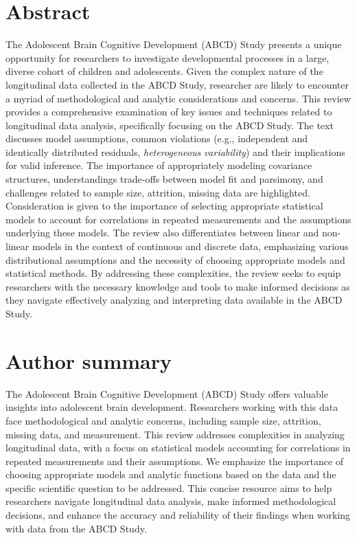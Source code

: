 \documentclass[
  10pt,
  letterpaper,
]{article}
\begin{document}
\section*{Abstract}
The Adolescent Brain Cognitive Development (ABCD) Study presents a
unique opportunity for researchers to investigate developmental
processes in a large, diverse cohort of children and adolescents. Given
the complex nature of the longitudinal data collected in the ABCD Study,
researcher are likely to encounter a myriad of methodological and
analytic considerations and concerns. This review provides a
comprehensive examination of key issues and techniques related to
longitudinal data analysis, specifically focusing on the ABCD Study. The
text discusses model assumptions, common violations (e.g., independent
and identically distributed residuals, \emph{heterogeneous}
\emph{variability}) and their implications for valid inference. The
importance of appropriately modeling covariance structures,
understandings trade-offs between model fit and parsimony, and
challenges related to sample size, attrition, missing data are
highlighted. Consideration is given to the importance of selecting
appropriate statistical models to account for correlations in repeated
measurements and the assumptions underlying these models. The review
also differentiates between linear and non-linear models in the context
of continuous and discrete data, emphasizing various distributional
assumptions and the necessity of choosing appropriate models and
statistical methods. By addressing these complexities, the review seeks
to equip researchers with the necessary knowledge and tools to make
informed decisions as they navigate effectively analyzing and
interpreting data available in the ABCD Study.

\section*{Author summary}
The Adolescent Brain Cognitive Development (ABCD) Study offers valuable
insights into adolescent brain development. Researchers working with
this data face methodological and analytic concerns, including sample
size, attrition, missing data, and measurement. This review addresses
complexities in analyzing longitudinal data, with a focus on statistical
models accounting for correlations in repeated measurements and their
assumptions. We emphasize the importance of choosing appropriate models
and analytic functions based on the data and the specific scientific
question to be addressed. This concise resource aims to help researchers
navigate longitudinal data analysis, make informed methodological
decisions, and enhance the accuracy and reliability of their findings
when working with data from the ABCD Study.
\end{document}
